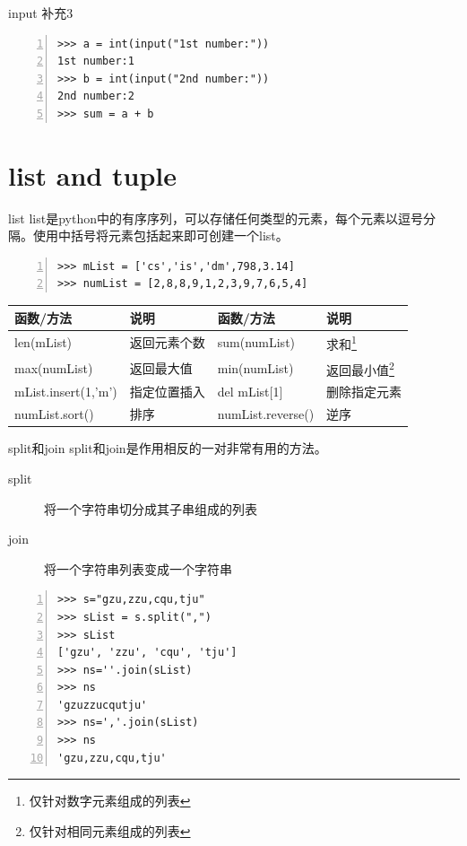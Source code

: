 \documentclass{beamer}
\begin{document}
\begin{frame}[fragile]{input 补充3}
\begin{block}{}
\begin{Verbatim}[numbers=left,frame=single,rulecolor=\color{red}]
>>> a = int(input("1st number:"))
1st number:1
>>> b = int(input("2nd number:"))
2nd number:2
>>> sum = a + b
\end{Verbatim}
\end{block}
\end{frame}
\section{list and tuple}
\begin{frame}
\end{frame}
\begin{frame}[fragile]{list}
list是python中的有序序列，可以存储任何类型的元素，每个元素以逗号分隔。使用中括号将元素包括起来即可创建一个list。
\begin{block}{}
\begin{Verbatim}[numbers=left,frame=single,rulecolor=\color{red}]
>>> mList = ['cs','is','dm',798,3.14]
>>> numList = [2,8,8,9,1,2,3,9,7,6,5,4]
\end{Verbatim}
\end{block}
\begin{table}
\begin{tabular}{llll}
\toprule
\textbf{函数/方法}&\textbf{说明}&\textbf{函数/方法}&\textbf{说明}\\
\midrule
len(mList)&返回元素个数&sum(numList)&求和\footnote{仅针对数字元素组成的列表}\\
max(numList)&返回最大值&min(numList)&返回最小值\footnote{仅针对相同元素组成的列表}\\
mList.insert(1,'m')&指定位置插入&del mList[1]&删除指定元素\\
numList.sort()&排序&numList.reverse()&逆序\\
\bottomrule
\end{tabular}
\end{table}

\end{frame}
\begin{frame}[fragile]{split和join}
split和join是作用相反的一对非常有用的方法。
\begin{description}
\item[split]
将一个字符串切分成其子串组成的列表
\item[join] 
将一个字符串列表变成一个字符串
\end{description}

\begin{block}{}
\begin{Verbatim}[numbers=left,frame=single,rulecolor=\color{red}]
>>> s="gzu,zzu,cqu,tju"
>>> sList = s.split(",")
>>> sList
['gzu', 'zzu', 'cqu', 'tju']
>>> ns=''.join(sList)
>>> ns
'gzuzzucqutju'
>>> ns=','.join(sList)
>>> ns
'gzu,zzu,cqu,tju'
\end{Verbatim}
\end{block}
\end{frame}
\end{document}
